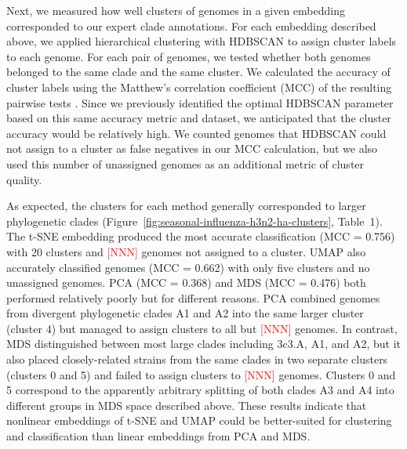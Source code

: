 \documentclass[9pt,lineno]{elife}
\def\jhc#1{\textcolor{red}{[#1]}}
\begin{document}
Next, we measured how well clusters of genomes in a given embedding corresponded to our expert clade annotations.
For each embedding described above, we applied hierarchical clustering with HDBSCAN to assign cluster labels to each genome.
For each pair of genomes, we tested whether both genomes belonged to the same clade and the same cluster.
We calculated the accuracy of cluster labels using the Matthew's correlation coefficient (MCC) of the resulting pairwise tests \citep{matthews_1975}.
Since we previously identified the optimal HDBSCAN parameter based on this same accuracy metric and dataset, we anticipated that the cluster accuracy would be relatively high.
We counted genomes that HDBSCAN could not assign to a cluster as false negatives in our MCC calculation, but we also used this number of unassigned genomes as an additional metric of cluster quality.

As expected, the clusters for each method generally corresponded to larger phylogenetic clades (Figure~\ref{fig:seasonal-influenza-h3n2-ha-clusters}, Table~1).
The t-SNE embedding produced the most accurate classification (MCC = 0.756) with 20 clusters and \jhc{NNN} genomes not assigned to a cluster.
UMAP also accurately classified genomes (MCC = 0.662) with only five clusters and no unassigned genomes.
PCA (MCC = 0.368) and MDS (MCC = 0.476) both performed relatively poorly but for different reasons.
PCA combined genomes from divergent phylogenetic clades A1 and A2 into the same larger cluster (cluster 4) but managed to assign clusters to all but \jhc{NNN} genomes.
In contrast, MDS distinguished between most large clades including 3c3.A, A1, and A2, but it also placed closely-related strains from the same clades in two separate clusters (clusters 0 and 5) and failed to assign clusters to \jhc{NNN} genomes.
Clusters 0 and 5 correspond to the apparently arbitrary splitting of both clades A3 and A4 into different groups in MDS space described above.
These results indicate that nonlinear embeddings of t-SNE and UMAP could be better-suited for clustering and classification than linear embeddings from PCA and MDS.
\end{document}
